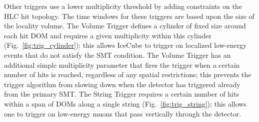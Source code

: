 Other triggers use a lower multiplicity threshold by adding constraints on
the HLC hit topology.  The time windows for these triggers are based upon
the size of the locality volume. The Volume Trigger defines a cylinder of fixed size around
each hit DOM and requires a given multiplicity within this cylinder
(Fig.~\ref{fig:trig_cylinder}); this allows IceCube to trigger on localized
low-energy events that do not satisfy the SMT condition.  The Volume Trigger
has an additional simple multiplicity parameter that fires the trigger when
a certain number of hits is reached, regardless of any spatial
restrictions; this prevents the trigger 
algorithm from slowing down when the detector has triggered already from
the primary SMT. The String Trigger requires a certain number of hits
within a span of DOMs along a single string 
(Fig.~\ref{fig:trig_string}); this allows one to trigger on low-energy
muons that pass vertically through the detector.

